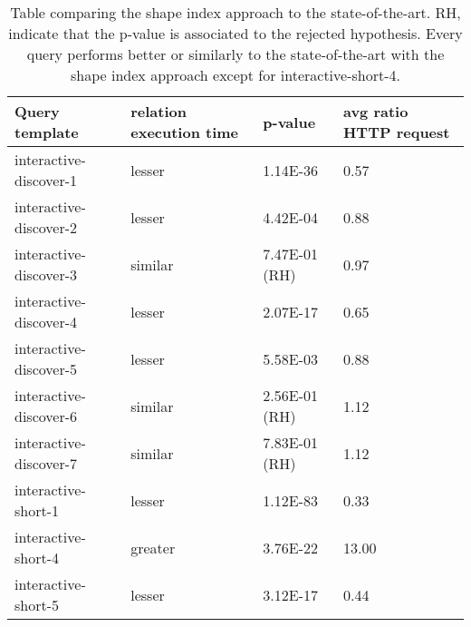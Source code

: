 \begin{table}
	\begin{center}
		\begin{tabular}{|l|l|l|l|}
			\hline
			Query template & relation execution time & p-value & avg ratio HTTP request \\
			\hline
			interactive-discover-1 & lesser & 1.14E-36 & 0.57 \\
			\hline
			interactive-discover-2 & lesser & 4.42E-04 & 0.88 \\
			\hline
			interactive-discover-3 & similar & 7.47E-01 (RH) & 0.97 \\
			\hline
			interactive-discover-4 & lesser & 2.07E-17 & 0.65 \\
			\hline
			interactive-discover-5 & lesser & 5.58E-03 & 0.88 \\
			\hline
			interactive-discover-6 & similar & 2.56E-01 (RH) & 1.12 \\
			\hline
			interactive-discover-7 & similar & 7.83E-01 (RH) & 1.12 \\
			\hline
			interactive-short-1 & lesser & 1.12E-83 & 0.33 \\
			\hline
			interactive-short-4 & greater & 3.76E-22 & 13.00 \\
			\hline
			interactive-short-5 & lesser & 3.12E-17 & 0.44 \\
			\hline
		\end{tabular}
	\end{center}
	\caption{Table comparing the shape index approach to the state-of-the-art. RH, indicate that the p-value is associated to the rejected hypothesis. Every query performs better or similarly to the state-of-the-art with the shape index approach except for interactive-short-4.}
	\label{tab:statSignificanceStateOfTheArt}
\end{table}
